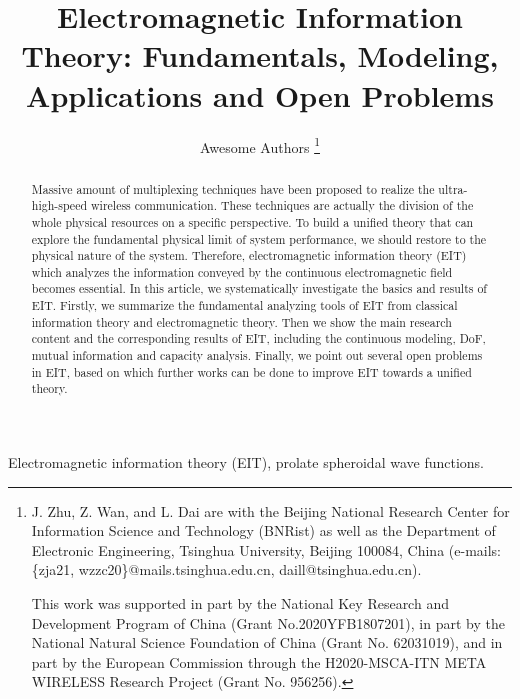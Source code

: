 \documentclass[journal,twocolumn]{IEEEtran}
\begin{document}
\title{Electromagnetic Information Theory: Fundamentals, Modeling, Applications and Open Problems}

\author{{Awesome Authors}
\thanks{J. Zhu, Z. Wan, and L. Dai are with the Beijing National Research Center for Information Science and Technology (BNRist) as well as the Department of Electronic Engineering, Tsinghua University, Beijing 100084, China (e-mails: \{zja21, wzzc20\}@mails.tsinghua.edu.cn, daill@tsinghua.edu.cn).


This work was supported in part by the National Key Research and Development Program of China (Grant No.2020YFB1807201), in part by the National Natural Science Foundation of China (Grant No. 62031019), and in part by the European Commission through the H2020-MSCA-ITN META WIRELESS Research Project (Grant No. 956256).}
}

\maketitle

\begin{abstract}
   Massive amount of multiplexing techniques have been proposed to realize the ultra-high-speed wireless communication. These techniques are actually the division of the whole physical resources on a specific perspective. To build a unified theory that can explore the fundamental physical limit of system performance, we should restore to the physical nature of the system. Therefore, electromagnetic information theory (EIT) which analyzes the information conveyed by the continuous electromagnetic field becomes essential. In this article, we systematically investigate the basics and results of EIT. Firstly, we summarize the fundamental analyzing tools of EIT from classical information theory and electromagnetic theory. Then we show the main research content and the corresponding results of EIT, including the continuous modeling, DoF, mutual information and capacity analysis. Finally, we point out several open problems in EIT, based on which further works can be done to improve EIT towards a unified theory.
\end{abstract}

\begin{IEEEkeywords}
    Electromagnetic information theory (EIT), prolate spheroidal wave functions. 
\end{IEEEkeywords}
\end{document}
